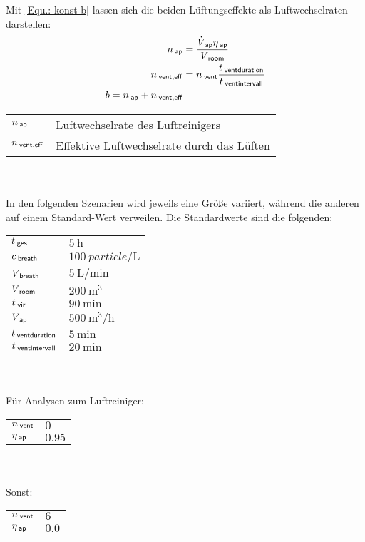 \documentclass[12pt,a4paper,bibtotocnumbered,liststotocnumbered]{scrreprt}
\begin{document}
Mit \autoref{Equ.: konst b} lassen sich die beiden Lüftungseffekte als Luftwechselraten darstellen:
\begin{align}
n_{\: \mathsf{ap}} &= \frac{\dot{V}_{\: \mathsf{ap}} \eta_{\: \mathsf{ap}}}{V_{\: \mathsf{room}}}\\
n_{\: \mathsf{vent,eff}} &= n_{\: \mathsf{vent}} \frac{t_{\: \mathsf{ventduration}}}{t_{\: \mathsf{ventintervall}}} \\
b = n_{\: \mathsf{ap}} + n_{\: \mathsf{vent,eff}}
\end{align}
\begin{tabular}{ll}
$n_{\: \mathsf{ap}}$ & Luftwechselrate des Luftreinigers \\
$n_{\: \mathsf{vent,eff}}$ &Effektive Luftwechselrate durch das Lüften\\
\end{tabular}
\\ \\
In den folgenden Szenarien wird jeweils eine Größe variiert, während die anderen auf einem Standard-Wert verweilen. Die Standardwerte sind die folgenden:\\
\begin{tabular}{ll}
$t_{\: \mathsf{ges}}$ & $\SI{5}{\hour}$   \\
$c_{\: \mathsf{breath}}$ & $\SI{100}{particle\per\liter}$ \\   
$V_{\: \mathsf{breath}}$ & $\SI{5}{\liter\per\minute}$   \\
$V_{\: \mathsf{room}}$ & $\SI{200}{\cubic\meter}$   \\
$t_{\: \mathsf{vir}}$ & $\SI{90}{\minute}$\\
$V_{\: \mathsf{ap}}$ & $\SI{500}{\cubic\meter\per\hour}$   \\
$t_{\: \mathsf{ventduration}}$ & $\SI{5}{\minute}$    \\
$t_{\: \mathsf{ventintervall}}$ & $\SI{20}{\minute}$    \\
\end{tabular}
\\ \\
Für Analysen zum Luftreiniger:\\
\begin{tabular}{ll}
$n_{\: \mathsf{vent}}$ & $0$ \\
$\eta_{\: \mathsf{ap}}$ & $0.95$    \\
\end{tabular}
\\ \\
Sonst:\\
\begin{tabular}{ll}
$n_{\: \mathsf{vent}}$ & $6$ \\
$\eta_{\: \mathsf{ap}}$ & $0.0$    \\
\end{tabular}
\end{document}
